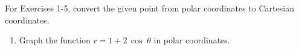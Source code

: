 \divider
\vspace{2mm}

\startexercises\label{sec6dot4}
\vspace{5mm}
{\small
\par\noindent For Exercises 1-5, convert the given point from polar coordinates to Cartesian
coordinates.
\begin{enumerate}[\bfseries 1.]
For Exercises 6-10, convert the given point from Cartesian coordinates to polar coordinates.
[{[\bfseries 1.]}]
For Exercises 11-18, write the given equation in polar coordinates.
[{[\bfseries 1.]}]
\item Graph the function $r = 1 + 2\,\cos\;\theta$ in polar coordinates.
\end{enumerate}}
